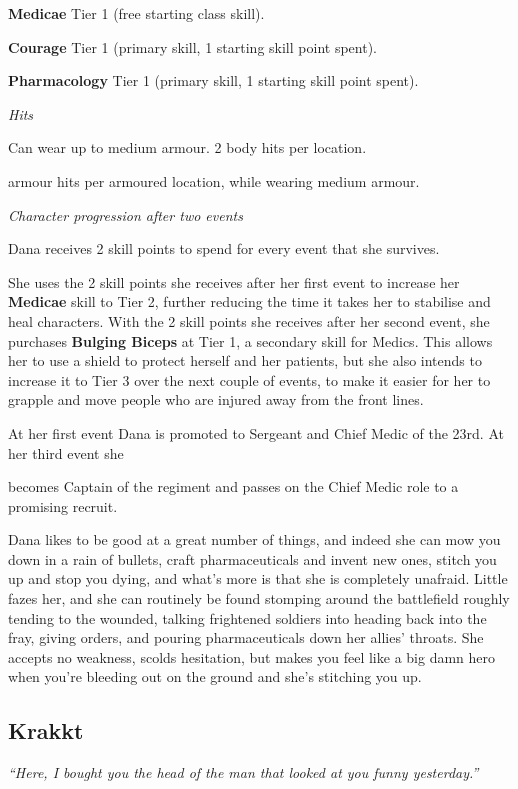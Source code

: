 \textbf{Medicae} Tier 1 (free starting class skill).

\textbf{Courage} Tier 1 (primary skill, 1 starting skill point spent).

\textbf{Pharmacology} Tier 1 (primary skill, 1 starting skill point spent).

\textit{Hits}

Can wear up to medium armour. 2 body hits per location.

armour hits per armoured location, while wearing medium armour.

\textit{Character progression after two events}

Dana receives 2 skill points to spend for every event that she survives.

She uses the 2 skill points she receives after her first event to increase her \textbf{Medicae} skill to Tier 2, further reducing the time it takes her to stabilise and heal characters. With the 2 skill points she receives after her second event, she purchases \textbf{Bulging Biceps} at Tier 1, a secondary skill for Medics. This allows her to use a shield to protect herself and her patients, but she also intends to increase it to Tier 3 over the next couple of events, to make it easier for her to grapple and move people who are injured away from the front lines.

At her first event Dana is promoted to Sergeant and Chief Medic of the 23rd. At her third event she

becomes Captain of the regiment and passes on the Chief Medic role to a promising recruit.

Dana likes to be good at a great number of things, and indeed she can mow you down in a rain of bullets, craft pharmaceuticals and invent new ones, stitch you up and stop you dying, and what's more is that she is completely unafraid. Little fazes her, and she can routinely be found stomping around the battlefield roughly tending to the wounded, talking frightened soldiers into heading back into the fray, giving orders, and pouring pharmaceuticals down her allies' throats. She accepts no weakness, scolds hesitation, but makes you feel like a big damn hero when you're bleeding out on the ground and she's stitching you up.

\subsection{Krakkt}

\textit{``Here, I bought you the head of the man that looked at you funny yesterday.''}

